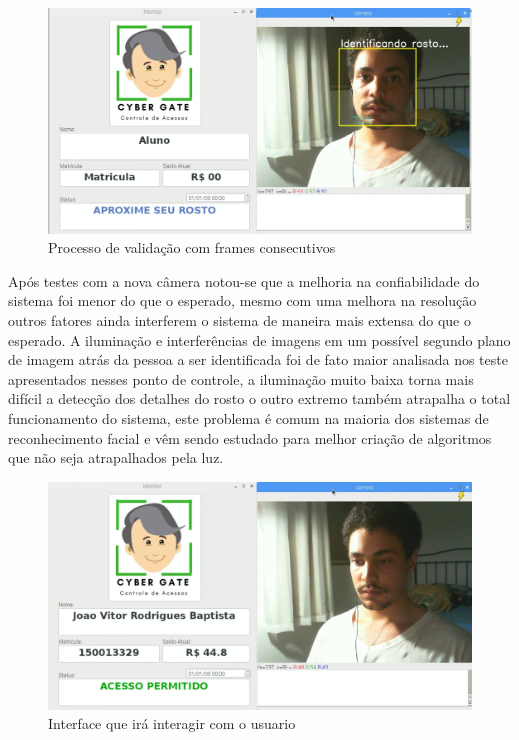 \documentclass[conference,compsoc]{IEEEtran}
\begin{document}
\begin{figure}[!ht]
		\centering
		\includegraphics[scale=0.15]{identificando.png}
		\caption{Processo de validação com frames consecutivos}
\end{figure}

	Após testes com a nova câmera notou-se que a melhoria na confiabilidade do sistema foi menor do que o esperado, mesmo com uma melhora na resolução outros fatores ainda interferem o sistema de maneira mais extensa do que o esperado. A iluminação e interferências de imagens em um possível segundo plano de imagem atrás da pessoa a ser identificada foi de fato maior analisada nos teste apresentados nesses ponto de controle, a iluminação muito baixa torna mais difícil a detecção dos detalhes do rosto o outro extremo também atrapalha o total funcionamento do sistema, este problema é comum na maioria dos sistemas de reconhecimento facial e vêm sendo estudado para melhor criação de algoritmos que não seja atrapalhados pela luz. 
	
	\begin{figure}[!ht]
		\centering
		\includegraphics[scale=0.20]{interface.png}
		\caption{Interface que irá interagir com o usuario}
\end{figure}
	
\end{document}
